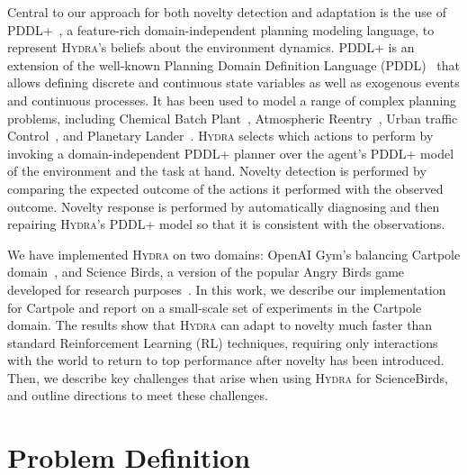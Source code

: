 \documentclass[sigconf]{aamas}
\newcommand{\hydra}{\textsc{Hydra}\xspace} %
\begin{document}
Central to our approach for both novelty detection and adaptation is the use of PDDL+~\cite{fox2006modelling}, a feature-rich domain-independent planning modeling language, to represent \hydra's beliefs about the environment dynamics. 
PDDL+ is an extension of the well-known Planning Domain Definition Language (PDDL)~\cite{mcdermott1998pddl} that allows defining discrete and continuous state variables as well as exogenous events and continuous processes. 
It has been used to model a range of complex planning problems, including Chemical Batch Plant~\cite{della2010pddl+}, Atmospheric Reentry~\cite{piotrowski2018heuristics}, Urban traffic Control~\cite{vallati2016efficient}, and Planetary Lander~\cite{della2010resource}.
\hydra selects which actions to perform by
invoking a domain-independent PDDL+ planner over 
the agent's PDDL+ model of the environment and the task at hand. 
Novelty detection is performed by comparing the expected outcome of the actions it performed %
with the observed outcome.  
Novelty response is performed by automatically diagnosing and then repairing \hydra's PDDL+ model so that it is consistent with the observations. 



We have implemented \hydra on two domains: OpenAI Gym's balancing Cartpole domain~\cite{brockman2016openai}, and Science Birds, a version of the popular Angry Birds game developed for research purposes~\cite{renz2019ai}. 
In this work, we describe our implementation for Cartpole and report on a small-scale set of experiments in the Cartpole domain. The results show that \hydra can adapt to novelty much faster than standard Reinforcement Learning (RL) techniques, requiring only  interactions with the world to return to top performance after novelty has been introduced. Then, we describe key challenges that arise when using \hydra for ScienceBirds, and outline directions to meet these challenges. 


\section{Problem Definition}
\end{document}
